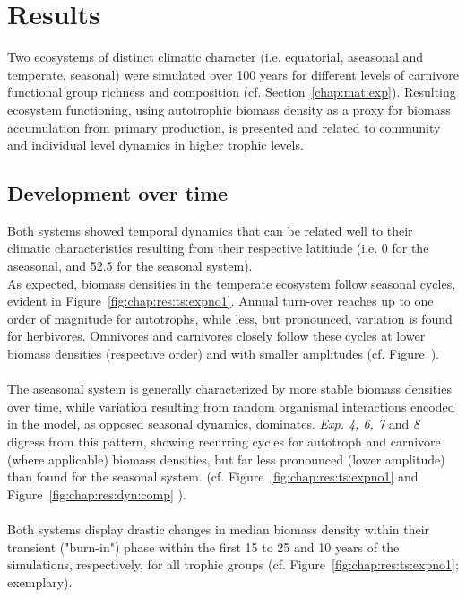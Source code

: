 \chapter{Results}
\label{chap:res}
Two ecosystems of distinct climatic character (i.e. equatorial, aseasonal and temperate, seasonal) were simulated over 100 years for different levels of carnivore functional group richness and composition (cf. Section~\ref{chap:mat:exp}). 
Resulting ecosystem functioning, using autotrophic biomass density as a proxy for biomass accumulation from primary production, is presented and related to community and individual level dynamics in higher trophic levels.
%

\section{Development over time}
\label{chap:res:dyn:temporal}
Both systems showed temporal dynamics that can be related well to their climatic characteristics resulting from their respective latitiude (i.e. 0 for the aseasonal, and 52.5 for the seasonal system).\\
As expected, biomass densities in the temperate ecosystem follow seasonal cycles, evident in Figure~\ref{fig:chap:res:ts:expno1}.
 Annual turn-over reaches up to one order of magnitude for autotrophs, while less, but pronounced, variation is found for herbivores.
  Omnivores and carnivores closely follow these cycles  at lower biomass densities (respective order) and with smaller amplitudes (cf. Figure~). \\\\
  The aseasonal system is generally characterized by more stable biomass densities over time, while variation resulting from random organismal interactions encoded in the model, as opposed seasonal dynamics, dominates. 
  \textit{Exp. 4, 6, 7} and \textit{8} digress from this pattern, showing recurring cycles for autotroph and carnivore (where applicable) biomass densities, but far less  pronounced (lower amplitude) than found for the seasonal system. 
(cf. Figure~\ref{fig:chap:res:ts:expno1} and Figure~\ref{fig:chap:res:dyn:comp}
 ).\\\\
Both systems display drastic changes in median biomass density within their transient ("burn-in") phase within the first 15 to 25 and 10 years of the simulations, respectively, for all trophic groups (cf. Figure~\ref{fig:chap:res:ts:expno1}; exemplary). 
